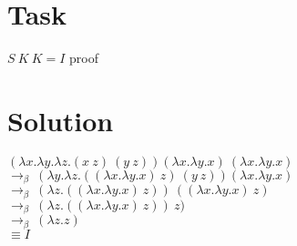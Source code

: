 \documentclass{article}
\begin{document}
\begin{center}

\section*{Task}
{\Large$S\ K\ K = I$ proof}\\

\section*{Solution}
    
{\Large$(\lambda x.\lambda y.\lambda z.(x\ z)\ (y\ z)) (\lambda x.\lambda y.x)\ (\lambda x.\lambda y.x)$\\
$\rightarrow_\beta\ (\lambda y.\lambda z.((\lambda x.\lambda y.x)\ z)\ (y\ z)) (\lambda x.\lambda y.x)$\\
$\rightarrow_\beta\ (\lambda z.((\lambda x.\lambda y.x)\ z))\ ((\lambda x.\lambda y.x)\ z)$\\
$\rightarrow_\beta\ (\lambda z.((\lambda x.\lambda y.x)\ z))\ z)$\\
$\rightarrow_\beta\ (\lambda z.z)$\\
$\equiv I$}

\end{center}
\end{document}
